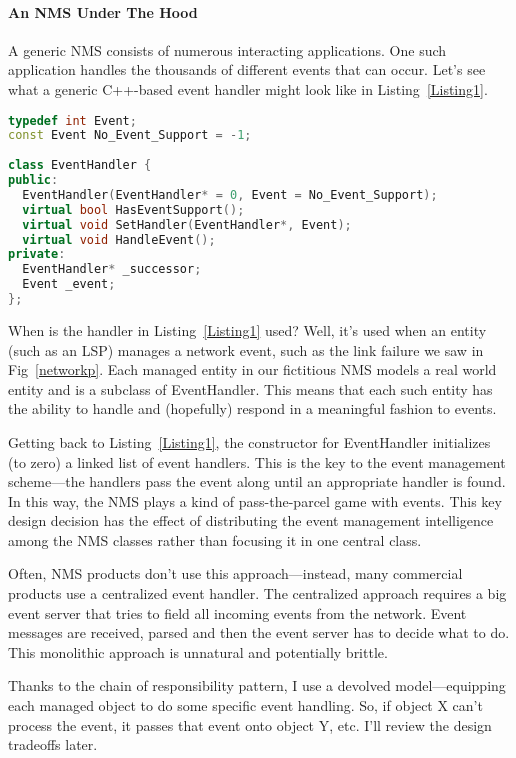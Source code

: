 \documentclass{book}
\begin{document}
\paragraph{An NMS Under The Hood}

A generic NMS consists of numerous interacting applications.
One such application handles the thousands of different events that can occur.
Let's see what a generic C++-based event handler might look like in Listing~\ref{Listing1}.
	
\begin{lstlisting}[caption={A generic network event handler class},label={Listing1},language=C++ ]
typedef int Event;
const Event No_Event_Support = -1;
 
class EventHandler {
public:
  EventHandler(EventHandler* = 0, Event = No_Event_Support);
  virtual bool HasEventSupport();
  virtual void SetHandler(EventHandler*, Event);
  virtual void HandleEvent();
private:
  EventHandler* _successor;
  Event _event; 
};
\end{lstlisting}

When is the handler in Listing~\ref{Listing1} used? Well, it's used when an entity (such as an LSP) manages a network event, such as the link failure we saw in Fig~\ref{networkp}.
Each managed entity in our fictitious NMS models a real world entity and is a subclass of EventHandler.
This means that each such entity has the ability to handle and (hopefully) respond in a meaningful fashion to events.

Getting back to Listing~\ref{Listing1}, the constructor for EventHandler initializes (to zero) a linked list of event handlers.
This is the key to the event management scheme—the handlers pass the event along until an appropriate handler is found. 
In this way, the NMS plays a kind of pass-the-parcel game with events.
This key design decision has the effect of distributing the event management intelligence among the NMS classes rather than focusing it in one central class.

Often, NMS products don't use this approach—instead, many commercial products use a centralized event handler.
The centralized approach requires a big event server that tries to field all incoming events from the network.
Event messages are received, parsed and then the event server has to decide what to do. This monolithic approach is unnatural and potentially brittle.

Thanks to the chain of responsibility pattern, I use a devolved model—equipping each managed object to do some specific event handling.
So, if object X can't process the event, it passes that event onto object Y, etc. I'll review the design tradeoffs later. 
\end{document}
